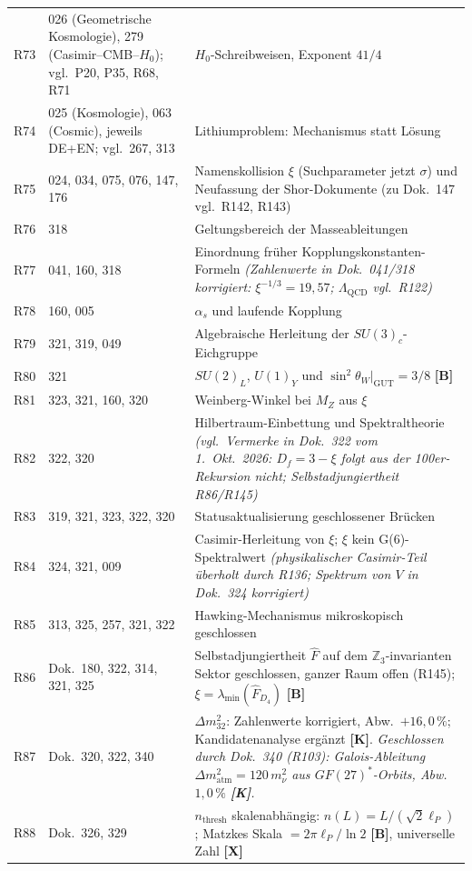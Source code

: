 \begin{longtable}{@{}p{0.9cm}p{3.1cm}p{10.2cm}@{}}
R73 & 026 (Geometrische Kosmologie), 279 (Casimir--CMB--$H_0$); vgl.\ P20, P35, R68, R71 & $H_0$-Schreibweisen, Exponent
$41/4$ \\
R74 & 025 (Kosmologie), 063 (Cosmic), jeweils DE+EN; vgl.\ 267, 313 & Lithiumproblem: Mechanismus
statt Lösung \\
R75 & 024, 034, 075, 076, 147, 176 & Namenskollision $\xi$ (Suchparameter jetzt $\sigma$) und Neufassung der Shor-Dokumente (zu Dok.~147 vgl.\ R142, R143) \\
R76 & 318 & Geltungsbereich der Masseableitungen \\
R77 & 041, 160, 318 & Einordnung früher Kopplungskonstanten-Formeln \emph{(Zahlenwerte in Dok.~041/318 korrigiert: $\xi^{-1/3}=19{,}57$; $\Lambda_{\mathrm{QCD}}$ vgl.\ R122)} \\
R78 & 160, 005 & $\alpha_s$ und laufende Kopplung \\
R79 & 321, 319, 049 & Algebraische Herleitung der $SU(3)_c$-Eichgruppe \\
R80 & 321 & $SU(2)_L$, $U(1)_Y$ und $\sin^2\theta_W|_{\mathrm{GUT}}=3/8$ \textbf{[B]} \\
R81 & 323, 321, 160, 320 & Weinberg-Winkel bei $M_Z$ aus $\xi$ \\
R82 & 322, 320 & Hilbertraum-Einbettung und Spektraltheorie \emph{(vgl.\ Vermerke in Dok.~322 vom 1.~Okt.~2026: $D_f=3-\xi$ folgt aus der 100er-Rekursion nicht; Selbstadjungiertheit R86/R145)} \\
R83 & 319, 321, 323, 322, 320 & Statusaktualisierung geschlossener Brücken \\
R84 & 324, 321, 009 & Casimir-Herleitung von $\xi$; $\xi$ kein G(6)-Spektralwert \emph{(physikalischer Casimir-Teil überholt durch R136; Spektrum von $V$ in Dok.~324 korrigiert)} \\
R85 & 313, 325, 257, 321, 322 & Hawking-Mechanismus mikroskopisch geschlossen \\
R86 & Dok.~180, 322, 314, 321, 325 & Selbstadjungiertheit $\hat{F}$ auf dem $\mathbb{Z}_3$-invarianten Sektor geschlossen, ganzer Raum offen (R145); $\xi = \lambda_{\min}(\hat{F}_{D_4})$ \textbf{[B]} \\
R87 & Dok.~320, 322, 340 & $\Delta m_{32}^2$: Zahlenwerte korrigiert, Abw.\ $+16{,}0\,\%$; Kandidatenanalyse ergänzt \textbf{[K]}. \emph{Geschlossen durch Dok.~340 (R103): Galois-Ableitung $\Delta m^2_\text{atm}=120\,m_\nu^2$ aus $GF(27)^*$-Orbits, Abw.\ $1{,}0\,\%$ \textbf{[K]}.} \\
R88 & Dok.~326, 329 & $n_{\mathrm{thresh}}$ skalenabhängig: $n(L)=L/(\sqrt{2}\ell_P)$; Matzkes Skala $=2\pi\ell_P/\ln 2$ \textbf{[B]}, universelle Zahl \textbf{[X]} \\

\end{longtable}
